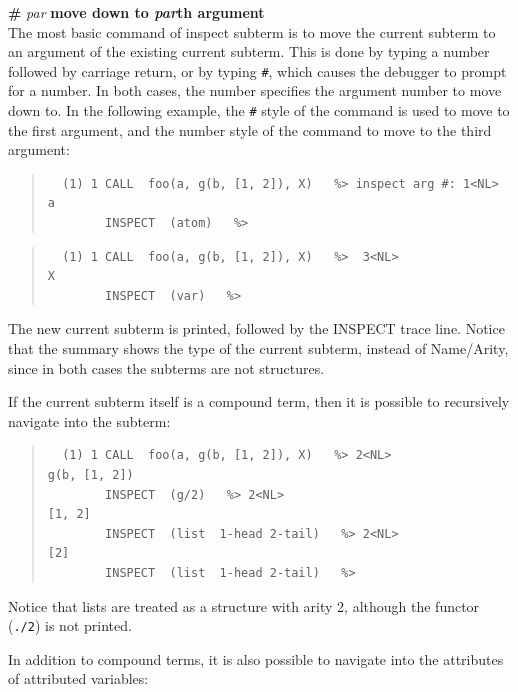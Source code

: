 \begin{descr}{1cm}


\item[{\bf \#} {\it par} \hfill]{\bf move down to {\it par}th argument}\\

The most basic command of inspect subterm is to move the current subterm to
an argument of the existing current subterm. This is done by typing a
number followed by carriage return, or by typing  \verb'#', which causes the
debugger to prompt for a number. In both cases, the number specifies the
argument number to move down to.
In the following example, the \verb'#' style of the command is used to move
to the first argument, and the number style of the command to move to the
third argument:

\begin{quote}\begin{verbatim}
  (1) 1 CALL  foo(a, g(b, [1, 2]), X)   %> inspect arg #: 1<NL>
a
        INSPECT  (atom)   %> 
\end{verbatim}\end{quote}

\begin{quote}\begin{verbatim}
  (1) 1 CALL  foo(a, g(b, [1, 2]), X)   %>  3<NL>
X
        INSPECT  (var)   %> 
\end{verbatim}\end{quote}

The new current subterm is printed, followed by the INSPECT
trace line. Notice that the summary shows the type of the current
subterm, instead of Name/Arity, since in both cases the subterms are not
structures. 

If the current subterm itself is a compound term, then it is possible to
recursively navigate into the subterm:

\begin{quote}\begin{verbatim}
  (1) 1 CALL  foo(a, g(b, [1, 2]), X)   %> 2<NL>
g(b, [1, 2])
        INSPECT  (g/2)   %> 2<NL>
[1, 2]
        INSPECT  (list  1-head 2-tail)   %> 2<NL>
[2]
        INSPECT  (list  1-head 2-tail)   %> 
\end{verbatim}\end{quote}

Notice that lists are treated as a structure with arity 2, although the
functor (\verb'./2') is not printed.

In addition to compound terms, it is also possible to navigate into the
attributes of attributed variables:


\end{descr}
